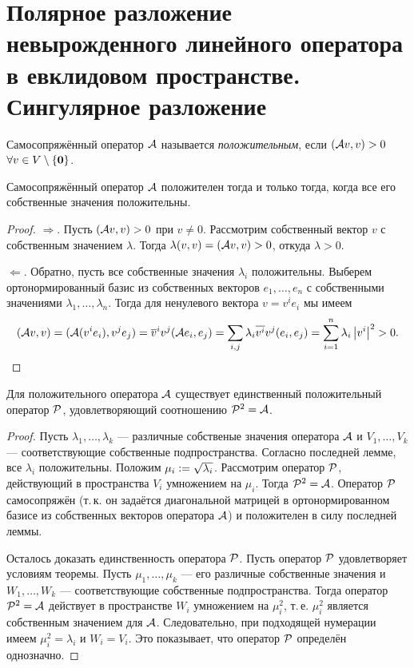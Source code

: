\section{Полярное разложение невырожденного линейного оператора в евклидовом пространстве. Сингулярное разложение}

\begin{definition}
    Самосопряжённый оператор $\A$ называется \textit{положительным}, если $(\A v, v) > 0$ $\forall v \in V \setminus \{\bs{0}\}$.
\end{definition}

\begin{lemma}
    Самосопряжённый оператор $\A$ положителен тогда и только тогда, когда все его собственные значения положительны. 
\end{lemma}

\begin{proof}
    $\Rightarrow$. Пусть $(\A v, v) > 0$ при $v \ne 0$. Рассмотрим собственный вектор $v$ с собственным значением $\lambda$. Тогда $\lambda(v, v) = (\A v, v) > 0$, откуда $\lambda > 0$.

    $\Leftarrow$. Обратно, пусть все собственные значения $\lambda_i$ положительны. Выберем ортонормированный базис из собственных векторов $e_1, \ldots, e_n$ с собственными значениями $\lambda_1, \ldots, \lambda_n$. Тогда для ненулевого вектора $v = v^ie_i$ мы имеем
    \[
        (\A v, v) = (\A(v^ie_i), v^je_j) = \overline{v}^iv^j(\A e_i, e_j) = \sum_{i, j}\lambda_i\overline{v^i}v^j(e_i, e_j) = \sum_{i = 1}^n\lambda_i\abs{v^i}^2 > 0.
    \]
\end{proof}

\begin{theorem}
    Для положительного оператора $\A$ существует единственный положительный оператор $\P$, удовлетворяющий соотношению $\P^2 = \A$.
\end{theorem}

\begin{proof}
    Пусть $\lambda_1, \ldots, \lambda_k$ --- различные собственые значения оператора $\A$ и $V_1, \ldots, V_k$ --- соответствующие собственные подпространства. Согласно последней лемме, все $\lambda_i$ положительны. Положим $\mu_i \vcentcolon = \sqrt{\lambda_i}$. Рассмотрим оператор $\P$, действующий в пространства $V_i$ умножением на $\mu_i$. Тогда $\P^2 = \A$. Оператор $\P$ самосопряжён (т.\,к. он задаётся диагональной матрицей в ортонормированном базисе из собственных векторов оператора $\A$) и положителен в силу последней леммы.

    Осталось доказать единственность оператора $\P$. Пусть оператор $\P$ удовлетворяет условиям теоремы. Пусть $\mu_1, \ldots, \mu_k$ --- его различные собственные значения и $W_1, \ldots, W_k$ --- соответствующие собственные подпространства. Тогда оператор $\P^2 = \A$ действует в пространстве $W_i$ умножением на $\mu_i^2$, т.\,е. $\mu_i^2$ является собственным значением для $\A$. Следовательно, при подходящей нумерации имеем $\mu_i^2 = \lambda_i$ и $W_i = V_i$. Это показывает, что оператор $\P$ определён однозначно.
\end{proof}

